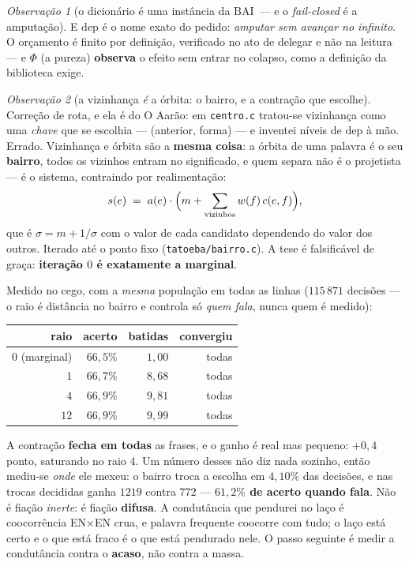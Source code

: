 \documentclass[11pt]{article}
\newcommand{\code}[1]{\texttt{\small #1}}
\theoremstyle{plain}
\theoremstyle{remark}
\newtheorem{obs}{Observação}
\providecommand{\BAI}{\ensuremath{\mathrm{BAI}}}
\providecommand{\dep}{\ensuremath{\mathrm{dep}}}
\begin{document}
\begin{obs}[o dicionário é uma instância da \BAI\ --- e o \emph{fail-closed} é a amputação]
E $\dep$ é o nome exato do pedido: \emph{amputar sem avançar no infinito}. O orçamento é finito por
definição, verificado no ato de delegar e não na leitura --- e $\Phi$ (a pureza) \textbf{observa} o efeito
sem entrar no colapso, como a definição da biblioteca exige.
\end{obs}

\begin{obs}[a vizinhança \emph{é} a órbita: o bairro, e a contração que escolhe]\label{obs:bairro}
Correção de rota, e ela é do O Aarão: em \code{centro.c} tratou-se vizinhança como uma \emph{chave} que se
escolhia --- (anterior, forma) --- e inventei níveis de $\dep$ à mão. Errado. Vizinhança e órbita são a
\textbf{mesma coisa}: a órbita de uma palavra é o seu \textbf{bairro}, todos os vizinhos entram no
significado, e quem separa não é o projetista --- é o sistema, contraindo por realimentação:
\[
 s(e)\;=\;a(e)\cdot\Bigl(m+\sum_{\text{vizinhos}} w(f)\,c(e,f)\Bigr),
\]
que é $\sigma=m+1/\sigma$ com o valor de cada candidato dependendo do valor dos outros. Iterado até o
ponto fixo (\code{tatoeba/bairro.c}). A tese é falsificável de graça: \textbf{iteração $0$ é exatamente
a marginal}.

Medido no cego, com a \emph{mesma} população em todas as linhas ($115\,871$ decisões --- o raio é
distância no bairro e controla só \emph{quem fala}, nunca quem é medido):

\begin{center}\small
\begin{tabular}{rrrr}
\toprule
raio & acerto & batidas & convergiu \\
\midrule
$0$ (marginal) & $66{,}5\%$ & $1{,}00$ & todas \\
$1$ & $66{,}7\%$ & $8{,}68$ & todas \\
$4$ & $66{,}9\%$ & $9{,}81$ & todas \\
$12$ & $66{,}9\%$ & $9{,}99$ & todas \\
\bottomrule
\end{tabular}
\end{center}

\noindent A contração \textbf{fecha em todas} as frases, e o ganho é real mas pequeno:
$+0{,}4$ ponto, saturando no raio $4$. Um número desses não diz nada sozinho, então mediu-se
\emph{onde} ele mexeu: o bairro troca a escolha em $4{,}10\%$ das decisões, e nas trocas decididas
ganha $1219$ contra $772$ --- \textbf{$61{,}2\%$ de acerto quando fala}. Não é fiação \emph{inerte}: é
fiação \textbf{difusa}. A condutância que pendurei no laço é coocorrência EN$\times$EN crua, e palavra
frequente coocorre com tudo; o laço está certo e o que está fraco é o que está pendurado nele. O passo
seguinte é medir a condutância contra o \textbf{acaso}, não contra a massa.


\end{obs}
\end{document}
